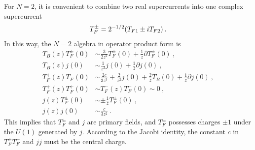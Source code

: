 For $N=2$, it is convenient to combine two real supercurrents into one complex supercurrent
\begin{equation}
	T_{F}^{\pm} = 2^{-1/2}(T_{F1}\pm i T_{F2}) \:. \label{11.1.3}
\end{equation}
In this way, the $N=2$ algebra in operator product form is
\begin{subequations}
	\begin{align}
		T_{B}(z)T_{F}^{\pm}(0)&\sim \frac{3}{2z^{2}} T_{F}^{\pm}(0) + \frac{1}{z}\partial T_{F}^{\pm}(0)\:,\label{11.1.4a} \\
		T_{B}(z) j(0) &\sim \frac{1}{z^{2}} j(0) +\frac{1}{z}\partial j(0) \:, \label{11.1.4b} \\
		T_{F}^{+}(z)T_{F}^{-}(0)&\sim \frac{2c}{3z^{3}}+\frac{2}{z^{2}}j(0)+\frac{2}{z}T_{B}(0)+\frac{1}{z}\partial j(0) \:,\label{11.1.4c} \\
		T^{+}_{F}(z)T^{+}_{F}(0)& \sim T^{-}_{F}(z)T^{-}_{F}(0) \sim 0 \:, \label{11.1.4d} \\
		j(z)T_{F}^{\pm}(0) &\sim \pm \frac{1}{z} T_{F}^{\pm}(0) \:, \label{11.1.4e} \\
		j(z)j(0) &\sim \frac{c}{3z^{2}}\:. \label{11.1.4f}
	\end{align}
\end{subequations}
This implies that $T_{F}^{\pm}$ and $j$ are primary fields, and $T_{F}^{\pm}$ possesses charges $\pm1$ under the $U(1)$ generated by $j$. According to the Jacobi identity, the constant $c$ in $T_{F}^{+}T_{F}^{-}$ and $jj$ must be the central charge.

